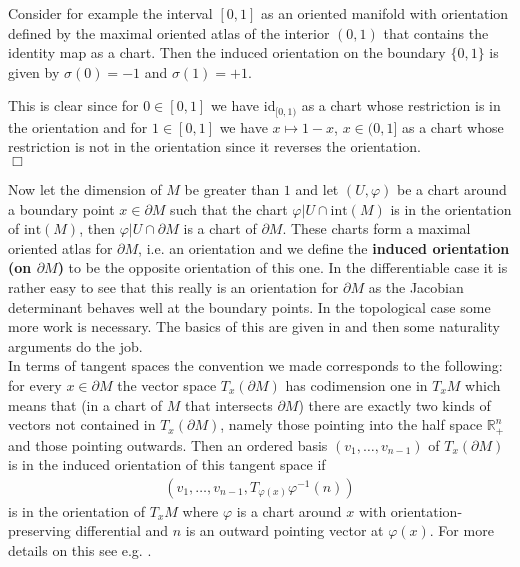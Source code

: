 \begin{exa}
\label{exa:orclint}
Consider for example the interval $[0,1]$ as an oriented manifold with orientation defined by the maximal oriented atlas of the interior $(0,1)$ that contains the identity map as a chart. Then the induced orientation on the boundary $\lbrace 0,1 \rbrace$ is given by $\sigma(0) = -1$ and $\sigma(1) = +1$.
\end{exa}
\begin{prf}
This is clear since for $0 \in [0,1]$ we have $\mathrm{id}_{[0,1)}$ as a chart whose restriction is in the orientation and for $1 \in [0,1]$ we have $x \mapsto 1-x$, $x \in (0,1]$ as a chart whose restriction is not in the orientation since it reverses the orientation.
\\
\phantom{proven}
\hfill
$\Box$
\end{prf}
Now let the dimension of $M$ be greater than $1$ and let $(U,\varphi)$ be a chart around a boundary point $x \in \partial M$ such that the chart $\varphi\vert U \cap \mathrm{int}(M)$ is in the orientation of $\mathrm{int}(M)$, then $\varphi\vert U \cap \partial M$ is a chart of $\partial M$. These charts form a maximal oriented atlas for $\partial M$, i.e. an orientation and we define the \textbf{induced orientation (on $\partial M$)} to be the opposite orientation of this one. In the differentiable case it is rather easy to see that this really is an orientation for $\partial M$ as the Jacobian determinant behaves well at the boundary points. In the topological case some more work is necessary. The basics of this are given in \cite{c75138fd} and then some naturality arguments do the job.
\\
In terms of tangent spaces the convention we made corresponds to the following: for every $x \in \partial M$ the vector space $T_{x}(\partial M)$ has codimension one in $T_{x}M$ which means that (in a chart of $M$ that intersects $\partial M$) there are exactly two kinds of vectors not contained in $T_{x}(\partial M)$, namely those pointing into the half space $\mathbb{R}_{+}^{n}$ and those pointing outwards. Then an ordered basis $(v_{1},\ldots,v_{n-1})$ of $T_{x}(\partial M)$ is in the induced orientation of this tangent space if
\begin{align*}
  \left(
    v_{1}
    ,
    \ldots
    ,
    v_{n-1}
    ,
    T_{\varphi(x)}\varphi^{-1}(n)
  \right)
\end{align*}
is in the orientation of $T_{x}M$ where $\varphi$ is a chart around $x$ with orientation-preserving differential and $n$ is an outward pointing vector at $\varphi(x)$. For more details on this see e.g. \cite{642a16a4}.
